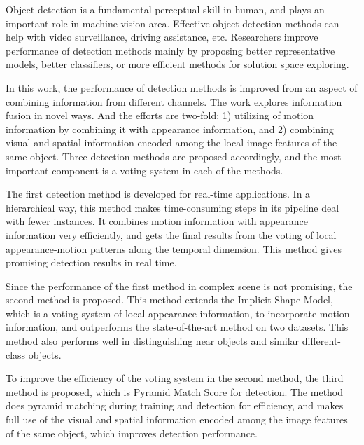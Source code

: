 \begin{eabstract}


Object detection is a fundamental perceptual skill in human, and plays an important role in machine vision area. Effective object detection methods can help with video surveillance, driving assistance, etc. Researchers improve performance of detection methods mainly by proposing better representative models, better classifiers, or more efficient methods for  solution space exploring.

In this work, the performance of detection methods is improved from an aspect of combining information from different channels. The work explores information fusion in novel ways. And the efforts are two-fold: 1) utilizing of motion information by combining it with appearance information, and 2) combining visual and spatial information encoded among the local image features of the same object. Three detection methods are proposed accordingly, and the most important component is a voting system in each of the methods.

The first detection method is developed for real-time applications. In a hierarchical way, this method makes time-consuming steps in its pipeline deal with fewer instances. It
combines motion information with appearance information very efficiently, and gets the final results from the voting of local appearance-motion patterns along the temporal dimension.  This method gives promising detection results in real time.

Since the performance of the first method in complex scene is not promising, the second method is proposed. This method extends the Implicit Shape Model, which is a voting system of local appearance information, to incorporate motion information, and outperforms the state-of-the-art method on two datasets. This method also performs well in distinguishing near objects and similar different-class objects.


To improve the efficiency of the voting system in the second method, the third method is proposed, which is Pyramid Match Score for detection. The method does pyramid matching during training and detection for efficiency, and makes full use of the visual and spatial  information encoded among the image features of the same object, which improves detection performance.
\end{eabstract}



